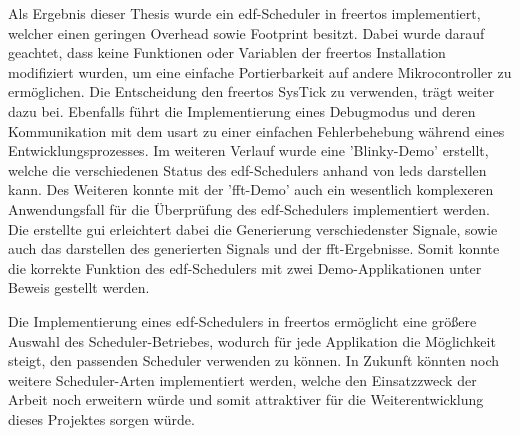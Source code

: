\documentclass[../EDF Master Thesis.tex]{subfiles}
\begin{document}
    Als Ergebnis dieser Thesis wurde ein \ac{edf}-Scheduler in \ac{freertos} implementiert, welcher einen geringen Overhead sowie Footprint besitzt.
    Dabei wurde darauf geachtet, dass keine Funktionen oder Variablen der \ac{freertos} Installation modifiziert wurden, um eine einfache Portierbarkeit auf andere Mikrocontroller zu ermöglichen.
    Die Entscheidung den \ac{freertos} SysTick zu verwenden, trägt weiter dazu bei.
    Ebenfalls führt die Implementierung eines Debugmodus und deren Kommunikation mit dem \ac{usart} zu einer einfachen Fehlerbehebung während eines Entwicklungsprozesses.
    Im weiteren Verlauf wurde eine 'Blinky-Demo' erstellt, welche die verschiedenen Status des \ac{edf}-Schedulers anhand von \ac{led}s darstellen kann.
    Des Weiteren konnte mit der '\ac{fft}-Demo' auch ein wesentlich komplexeren Anwendungsfall für die Überprüfung des \ac{edf}-Schedulers implementiert werden.
    Die erstellte \ac{gui} erleichtert dabei die Generierung verschiedenster Signale, sowie auch das darstellen des generierten Signals und der \ac{fft}-Ergebnisse.
    Somit konnte die korrekte Funktion des \ac{edf}-Schedulers mit zwei Demo-Applikationen unter Beweis gestellt werden.

    Die Implementierung eines \ac{edf}-Schedulers in \ac{freertos} ermöglicht eine größere Auswahl des Scheduler-Betriebes, wodurch für jede Applikation die Möglichkeit steigt, den passenden Scheduler verwenden zu können.
    In Zukunft könnten noch weitere Scheduler-Arten implementiert werden, welche den Einsatzzweck der Arbeit noch erweitern würde und somit attraktiver für die Weiterentwicklung dieses Projektes sorgen würde. 
    
    
\end{document}
